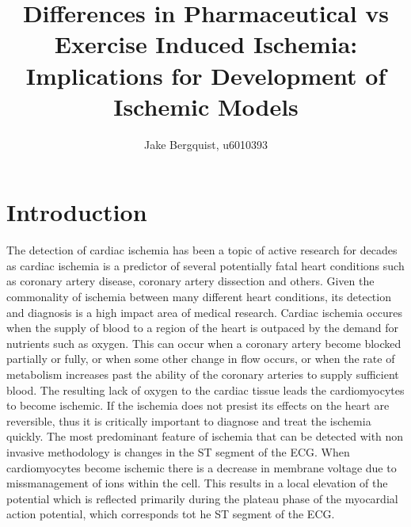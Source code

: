 \documentclass[12pt]{article}
\begin{document}
\title{Differences in Pharmaceutical vs Exercise Induced Ischemia: Implications for Development of Ischemic Models }

\author{Jake Bergquist, u6010393}
\maketitle

\section{Introduction}

The detection of cardiac ischemia has been a topic of active research for decades as cardiac ischemia is a predictor of several potentially fatal heart conditions such as coronary artery disease, coronary artery dissection and others.\cite{BLZ:Saf2018,BLZ:Jes2013,BLZ:Noe2017,BLZ:Jes2012} Given the commonality of ischemia between many different heart conditions, its detection and diagnosis is a high impact area of medical research. Cardiac ischemia occures when the supply of blood to a region of the heart is outpaced by the demand for nutrients such as oxygen. This can occur when a coronary artery become blocked partially or fully, or when some other change in flow occurs, or when the rate of metabolism increases past the ability of the coronary arteries to supply sufficient blood. The resulting lack of oxygen to the cardiac tissue leads the cardiomyocytes to become ischemic. If the ischemia does not presist its effects on the heart are reversible, thus it is critically important to diagnose and treat the ischemia quickly. The most predominant feature of ischemia that can be detected with non invasive methodology is changes in the ST segment of the ECG.\cite{RSM:Jan86a} When cardiomyocytes become ischemic there is a decrease in membrane voltage due to  missmanagement of ions within the cell. This results in a local elevation of the potential which is reflected primarily during the plateau phase of the myocardial action potential, which corresponds tot he ST segment of the ECG. 


\end{document}

